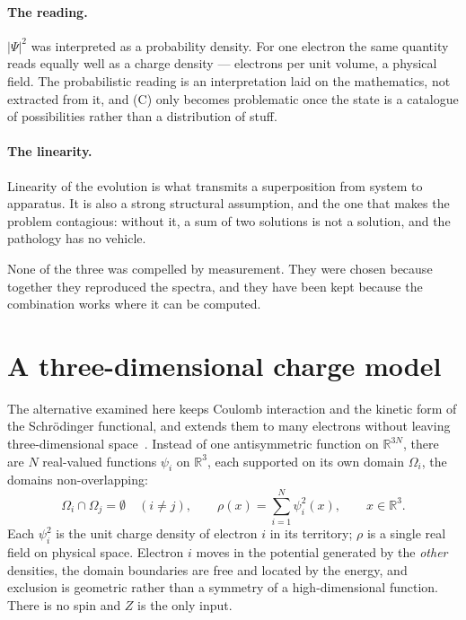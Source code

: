 \documentclass[11pt]{article}
\begin{document}
\paragraph{The reading.} $|\Psi|^2$ was interpreted as a probability density. For one electron the
same quantity reads equally well as a charge density --- electrons per unit volume, a physical
field. The probabilistic reading is an interpretation laid on the mathematics, not extracted from
it, and (C) only becomes problematic once the state is a catalogue of possibilities rather than a
distribution of stuff.

\paragraph{The linearity.} Linearity of the evolution is what transmits a superposition from system
to apparatus. It is also a strong structural assumption, and the one that makes the problem
contagious: without it, a sum of two solutions is not a solution, and the pathology has no vehicle.

None of the three was compelled by measurement. They were chosen because together they reproduced
the spectra, and they have been kept because the combination works where it can be computed.

\section{A three-dimensional charge model}\label{sec:realqm}

The alternative examined here keeps Coulomb interaction and the kinetic form of the Schr\"odinger
functional, and extends them to many electrons without leaving three-dimensional
space~\cite{RealQM}. Instead of one antisymmetric function on $\mathbb{R}^{3N}$, there are $N$
real-valued functions $\psi_i$ on $\mathbb{R}^3$, each supported on its own domain $\Omega_i$, the
domains non-overlapping:
\begin{equation}
\Omega_i \cap \Omega_j = \emptyset \quad (i \neq j), \qquad
\rho(x) = \sum_{i=1}^{N} \psi_i^2(x), \qquad x \in \mathbb{R}^3 .
\label{eq:state}
\end{equation}
Each $\psi_i^2$ is the unit charge density of electron $i$ in its territory; $\rho$ is a single
real field on physical space. Electron $i$ moves in the potential generated by the \emph{other}
densities, the domain boundaries are free and located by the energy, and exclusion is geometric
rather than a symmetry of a high-dimensional function. There is no spin and $Z$ is the only input.
\end{document}
